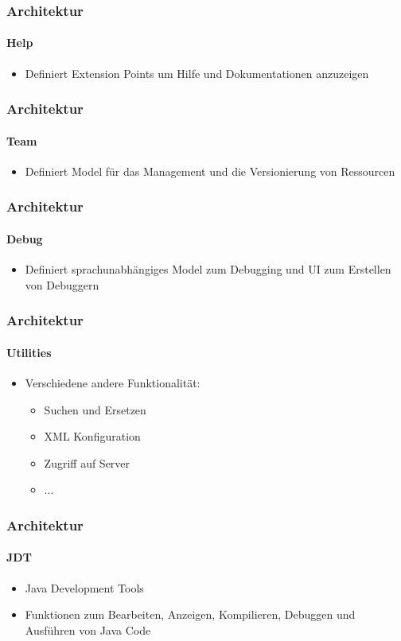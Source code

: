 {\begin{frame}
  \frametitle{Architektur}
  \framesubtitle{Help}
  \begin{itemize}
    \item Definiert Extension Points um Hilfe und Dokumentationen anzuzeigen
  \end{itemize}
\end{frame}

\begin{frame}
  \frametitle{Architektur}
  \framesubtitle{Team}
  \begin{itemize}
    \item Definiert Model für das Management und die Versionierung von Ressourcen
  \end{itemize}
\end{frame}

\begin{frame}
  \frametitle{Architektur}
  \framesubtitle{Debug}
  \begin{itemize}
    \item Definiert sprachunabhängiges Model zum Debugging und UI zum Erstellen von Debuggern
  \end{itemize}
\end{frame}

\begin{frame}
  \frametitle{Architektur}
  \framesubtitle{Utilities}
  \begin{itemize}
    \item Verschiedene andere Funktionalität:
    \begin{itemize}
      \item Suchen und Ersetzen
      \item XML Konfiguration
      \item Zugriff auf Server
      \item ...
    \end{itemize}
  \end{itemize}
\end{frame}

\begin{frame}
	\frametitle{Architektur}
	\framesubtitle{JDT}
	\begin{itemize}
		\item Java Development Tools
		\item Funktionen zum Bearbeiten, Anzeigen, Kompilieren, Debuggen und Ausführen von Java Code
	\end{itemize}
\end{frame}

}
